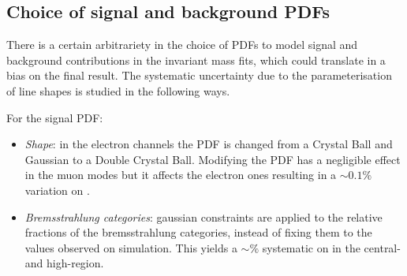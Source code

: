\subsection{Choice of signal and background PDFs}

There is a certain arbitrariety in the choice of PDFs to model signal and background contributions in the
invariant mass fits, which could translate in a bias on the final result. The systematic uncertainty due to the
parameterisation of line shapes is studied in the following ways.

For the signal PDF:
%
\begin{itemize}

\item \textit{Shape}: in the electron channels the PDF is changed from a Crystal Ball and Gaussian to a Double Crystal Ball.
Modifying the PDF has a negligible effect in the muon modes but it affects the electron ones resulting in a $\sim 0.1\%$
variation on \RKst.

\item \textit{Bremsstrahlung categories}: gaussian constraints are applied to the relative fractions of the bremsstrahlung
categories, instead of fixing them to the values observed on simulation.
This yields a $\sim \%$ systematic on \RKst in the central- and high-\qsq region.


\end{itemize}

